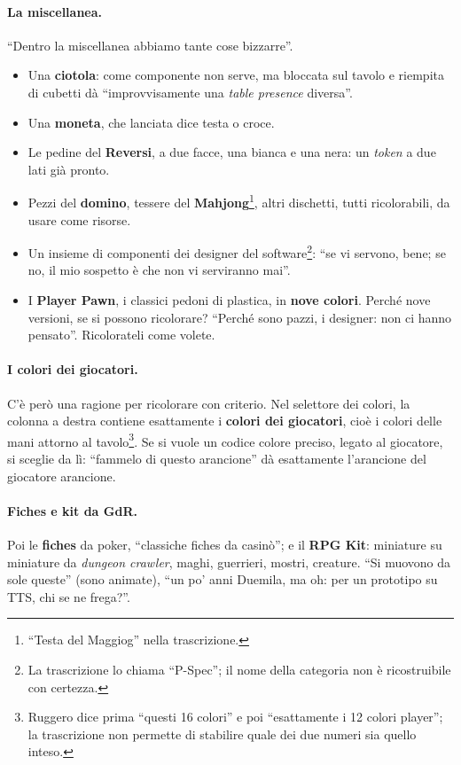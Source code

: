 \paragraph{La miscellanea.} ``Dentro la miscellanea abbiamo tante cose bizzarre''.
\begin{itemize}
  \item Una \textbf{ciotola}: come componente non serve, ma bloccata sul tavolo e
        riempita di cubetti dà ``improvvisamente una \emph{table presence}
        diversa''.
  \item Una \textbf{moneta}, che lanciata dice testa o croce.
  \item Le pedine del \textbf{Reversi}, a due facce, una bianca e una nera: un
        \emph{token} a due lati già pronto.
  \item Pezzi del \textbf{domino}, tessere del \textbf{Mahjong}\footnote{``Testa del
        Maggiog'' nella trascrizione.}, altri dischetti, tutti ricolorabili, da
        usare come risorse.
  \item Un insieme di componenti dei designer del software\footnote{La trascrizione
        lo chiama ``P-Spec''; il nome della categoria non è ricostruibile con
        certezza.}: ``se vi servono, bene; se no, il mio sospetto è che non vi
        serviranno mai''.
  \item I \textbf{Player Pawn}, i classici pedoni di plastica, in \textbf{nove
        colori}. Perché nove versioni, se si possono ricolorare? ``Perché sono pazzi, i
        designer: non ci hanno pensato''. Ricolorateli come volete.
\end{itemize}

\paragraph{I colori dei giocatori.} C'è però una ragione per ricolorare con criterio.
Nel selettore dei colori, la colonna a destra contiene esattamente i \textbf{colori dei
giocatori}, cioè i colori delle mani attorno al tavolo\footnote{Ruggero dice prima
``questi 16 colori'' e poi ``esattamente i 12 colori player''; la trascrizione non
permette di stabilire quale dei due numeri sia quello inteso.}. Se si vuole un codice
colore preciso, legato al giocatore, si sceglie da lì: ``fammelo di questo arancione''
dà esattamente l'arancione del giocatore arancione.

\paragraph{Fiches e kit da GdR.} Poi le \textbf{fiches} da poker, ``classiche fiches
da casinò''; e il \textbf{RPG Kit}: miniature su miniature da \emph{dungeon crawler},
maghi, guerrieri, mostri, creature. ``Si muovono da sole queste'' (sono animate), ``un
po' anni Duemila, ma oh: per un prototipo su TTS, chi se ne frega?''.

